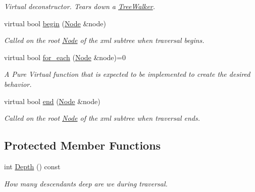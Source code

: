 \begin{DoxyCompactItemize}
\begin{DoxyCompactList}\small\item\em Virtual deconstructor. Tears down a \hyperlink{classphys_1_1xml_1_1TreeWalker}{TreeWalker}. \item\end{DoxyCompactList}\item 
virtual bool \hyperlink{classphys_1_1xml_1_1TreeWalker_a649d9e5a06542be0282d3d20994a62fc}{begin} (\hyperlink{classphys_1_1xml_1_1Node}{Node} \&node)
\begin{DoxyCompactList}\small\item\em Called on the root \hyperlink{classphys_1_1xml_1_1Node}{Node} of the xml subtree when traversal begins. \item\end{DoxyCompactList}\item 
virtual bool \hyperlink{classphys_1_1xml_1_1TreeWalker_a03267e73acac44809f16739fd00a536d}{for\_\-each} (\hyperlink{classphys_1_1xml_1_1Node}{Node} \&node)=0
\begin{DoxyCompactList}\small\item\em A Pure Virtual function that is expected to be implemented to create the desired behavior. \item\end{DoxyCompactList}\item 
virtual bool \hyperlink{classphys_1_1xml_1_1TreeWalker_a210f6d60579a152f89e651be797885b9}{end} (\hyperlink{classphys_1_1xml_1_1Node}{Node} \&node)
\begin{DoxyCompactList}\small\item\em Called on the root \hyperlink{classphys_1_1xml_1_1Node}{Node} of the xml subtree when traversal ends. \item\end{DoxyCompactList}\end{DoxyCompactItemize}
\subsection*{Protected Member Functions}
\begin{DoxyCompactItemize}
\item 
int \hyperlink{classphys_1_1xml_1_1TreeWalker_a90fdd705ae4d5e8e3b931bb8896e4397}{Depth} () const 
\begin{DoxyCompactList}\small\item\em How many descendants deep are we during traversal. \item\end{DoxyCompactList}\end{DoxyCompactItemize}
